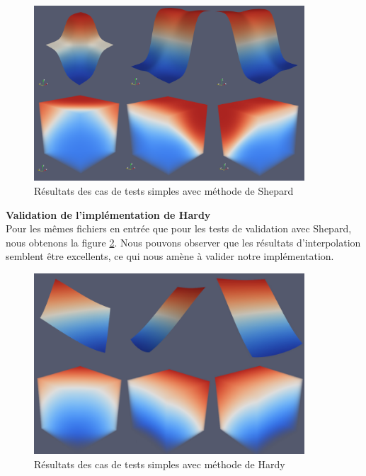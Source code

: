 \documentclass[a4paper,9pt]{article}
\begin{document}
\begin{figure}[!h]
\centering
\includegraphics[width=0.9\textwidth]{images/shepard/tests_simples_sh.png}
\caption{Résultats des cas de tests simples avec méthode de Shepard}
\label{tests_simples_sh}
\end{figure}

\textbf{Validation de l'implémentation de Hardy}\\
Pour les mêmes fichiers en entrée que pour les tests de validation avec Shepard, nous obtenons la figure \ref{tests_simples_hardy}. Nous pouvons observer que les résultats d'interpolation semblent être excellents, ce qui nous amène à valider notre implémentation.
\begin{figure}[!h]
\centering
\includegraphics[width=0.9\textwidth]{images/multiquadric/tests_simples_mq.png}
\caption{Résultats des cas de tests simples avec méthode de Hardy}
\label{tests_simples_hardy}
\end{figure}
\end{document}
